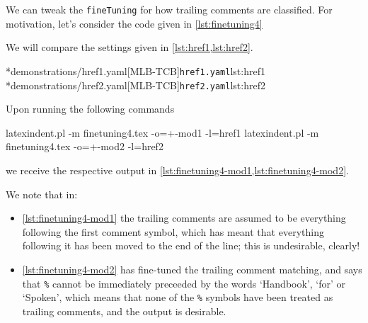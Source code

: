  \begin{example}
	 We can tweak the \texttt{fineTuning} for how trailing comments are classified. For motivation, let's consider
	 the code given in \cref{lst:finetuning4}


	 We will compare the settings given in \cref{lst:href1,lst:href2}.

	 \begin{cmhtcbraster}[raster column skip=.01\linewidth,
			 raster left skip=0cm,
			 raster right skip=-0.5cm,]
		 \cmhlistingsfromfile*[style=yaml-LST]*{demonstrations/href1.yaml}[MLB-TCB]{\texttt{href1.yaml}}{lst:href1}
		 \cmhlistingsfromfile*[style=yaml-LST]*{demonstrations/href2.yaml}[MLB-TCB]{\texttt{href2.yaml}}{lst:href2}
	 \end{cmhtcbraster}

	 Upon running the following commands
	 \begin{commandshell}
latexindent.pl -m finetuning4.tex -o=+-mod1 -l=href1
latexindent.pl -m finetuning4.tex -o=+-mod2 -l=href2
\end{commandshell}
	 we receive the respective output in \cref{lst:finetuning4-mod1,lst:finetuning4-mod2}.

	 \begin{widepage}

	 \end{widepage}

	 We note that in:
	 \begin{itemize}
		 \item \cref{lst:finetuning4-mod1} the trailing comments are assumed to be everything following the
		       first comment symbol, which
		       has meant that everything following it has been moved to the end of the line; this is
		       undesirable, clearly!
		 \item \cref{lst:finetuning4-mod2} has fine-tuned the trailing comment matching, and says that
		       \lstinline!%! cannot
		       be immediately preceeded by the words `Handbook', `for' or `Spoken', which means that
		       none of the \lstinline!%! symbols have been treated as trailing comments, and
		       the output is desirable.
	 \end{itemize}


\end{example}
